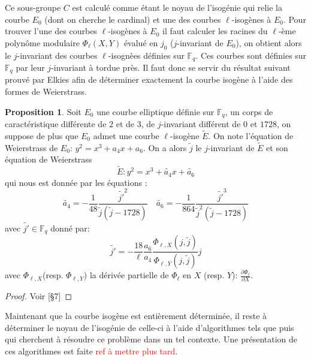 \documentclass[10pt,a4paper]{book}
\theoremstyle{plain}
\theoremstyle{definition}
\theoremstyle{definition}
\theoremstyle{definition}
\newtheorem{prop}[thm]{Proposition}
\theoremstyle{definition}
\theoremstyle{remark}
\theoremstyle{remark}
\theoremstyle{definition}
\begin{document}
Ce sous-groupe $C$ est calculé comme étant le noyau de l'isogénie qui relie la courbe $E_0$ (dont on cherche le cardinal) et une des courbes $\ell$-isogènes à $E_0$. Pour trouver l'une des courbes $\ell$-isogènes à $E_0$ il faut calculer les racines du $\ell$-ème polynôme modulaire $\Phi_{\ell}(X,Y)$ évalué en $j_0$ ($j$-invariant de $E_0$), on obtient alors le $j$-invariant des courbes $\ell$-isognèes définies sur $\mathbb{F}_q$. Ces courbes sont définies sur $\mathbb{F}_q$ par leur $j$-invariant à tordue près. Il faut donc se servir du résultat suivant prouvé par Elkies afin de déterminer exactement la courbe isogène à l'aide des formes de Weierstrass.

\begin{prop}
\label{prop:elk:nor}
Soit $E_0$ une courbe elliptique définie sur $\mathbb{F}_q$, un corps de caractéristique différente de $2$ et de $3$, de $j$-invariant différent de $0$ et $1728$, on suppose de plus que $E_0$ admet une courbe $\ell$-isogène $\tilde{E}$. On note l'équation de Weierstrass de $E_0$: $y^2=x^3+a_4x+a_6$. On a alors $\tilde{j}$ le $j$-invariant de $\tilde{E}$ et son équation de Weierstrass
\begin{equation*}
\tilde{E}:y^2=x^3+\tilde{a_4}x+\tilde{a_6}
\end{equation*}
 qui nous est donnée par les équations : 
\begin{equation*}
\tilde{a_4}=-\frac{1}{48}\frac{\tilde{j'}^2}{\tilde{j}(\tilde{j}-1728)} \quad \tilde{a_6}=-\frac{1}{864}\frac{\tilde{j'}^3}{\tilde{j}^2(\tilde{j}-1728)}
\end{equation*}
avec $\tilde{j'} \in \mathbb{F}_q$ donné par:
\begin{equation*}
\tilde{j'}=-\frac{18}{\ell}\frac{a_6}{a_4}\frac{\Phi_{\ell,X}(j,\tilde{j})}{\Phi_{\ell,Y}(j,\tilde{j})}j
\end{equation*}
avec $\Phi_{\ell,X}$(resp. $\Phi_{\ell,Y}$) la dérivée partielle de $\Phi_{\ell}$ en $X$ (resp. $Y$): $\frac{\partial \Phi_{\ell}}{\partial X} $.
\end{prop} 

\begin{proof}
Voir \cite{Schoof95}[§7]
\end{proof}

Maintenant que la courbe isogène est entièrement déterminée, il reste à déterminer le noyau de l'isogénie de celle-ci à l'aide d'algorithmes tels que \cite{BMSS08}  puis \cite{Lercier-Sirvent2008} qui cherchent à résoudre ce problème dans un tel contexte. Une présentation de ces algorithmes est faite \textcolor{red}{ref à mettre plus tard}.
\end{document}
